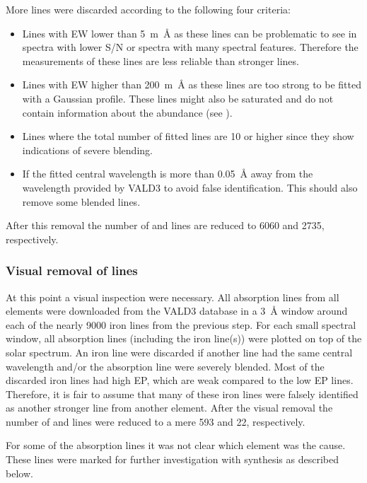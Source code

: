More lines were discarded according to the following four criteria:

\begin{itemize}
  \item Lines with EW lower than \SI{5}{m\angstrom} as these lines can be problematic to see in
        spectra with lower S/N or spectra with many spectral features. Therefore the measurements
        of these lines are less reliable than stronger lines.
  \item Lines with EW higher than \SI{200}{m\angstrom} as these lines are too strong to be fitted
        with a Gaussian profile. These lines might also be saturated and do not contain information
        about the abundance (see ).
  \item Lines where the total number of fitted lines are 10 or higher since they show indications of
        severe blending.
  \item If the fitted central wavelength is more than \SI{0.05}{\angstrom} away from the wavelength
        provided by VALD3 to avoid false identification. This should also remove some blended lines.
\end{itemize}
After this removal the number of  and  lines are reduced to \num{6060} and
\num{2735}, respectively.


\subsubsection{Visual removal of lines}

At this point a visual inspection were necessary. All absorption lines from all elements were
downloaded from the VALD3 database in a \SI{3}{\angstrom} window around each of the nearly
\num{9000} iron lines from the previous step. For each small spectral window, all absorption lines
(including the iron line(s)) were plotted on top of the solar spectrum. An iron line were discarded
if another line had the same central wavelength and/or the absorption line were severely blended.
Most of the discarded iron lines had high EP, which are weak compared to the low EP lines.
Therefore, it is fair to assume that many of these iron lines were falsely identified as another
stronger line from another element. After the visual removal the number of  and
 lines were reduced to a mere 593 and 22, respectively.

For some of the absorption lines it was not clear which element was the cause. These lines were
marked for further investigation with synthesis as described below.

